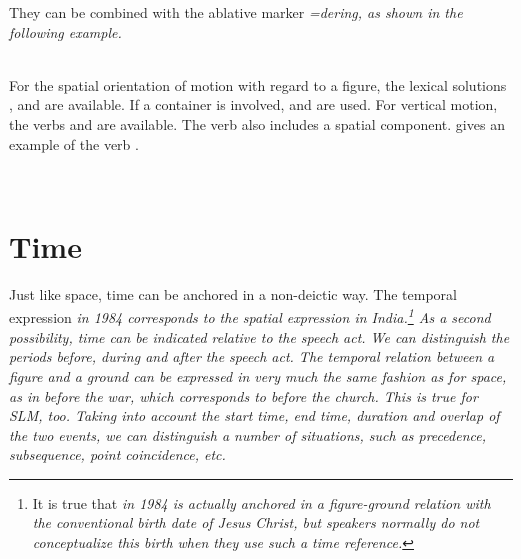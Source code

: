 They can be combined with the ablative marker \em =dering\em, as shown in the following example.

 \\
For the spatial orientation of motion with regard to a figure, the lexical solutions ,  and  are available. If a container is involved,  and  are used. For vertical motion, the verbs  and  are available. The verb  also includes a spatial component.   gives an example of the verb .


\\


\section{Time}\label{sec:func:Time}


Just like space, time can be anchored in a non-deictic way. The temporal expression \em in 1984 \em corresponds to the spatial expression \em in India\em.\footnote{It is true that \em in 1984 \em is actually anchored in a figure-ground relation with the conventional  birth date of Jesus Christ, but speakers normally do not conceptualize this birth when they use such a time reference.}
As a second possibility, time can be indicated relative to the speech act. We can distinguish the periods before, during and after the speech act.
The temporal relation between a figure and a ground can be expressed in very much the same fashion as for space, as in \em before the war\em, which corresponds to \em before the church\em. This is true for SLM, too. Taking into account the start time, end time, duration and overlap of the two events, we can distinguish a number of situations, such as precedence, subsequence, point coincidence, etc.

